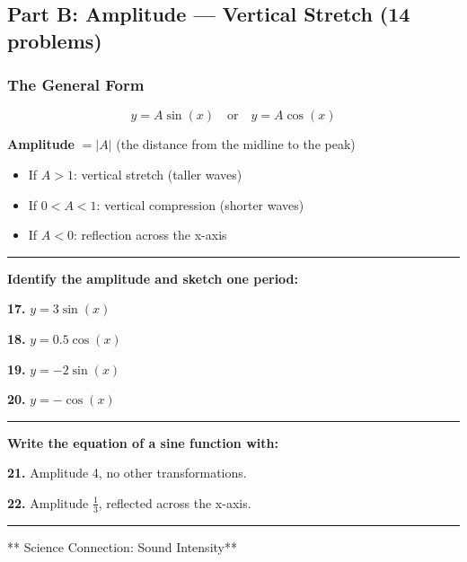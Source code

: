 \documentclass[
  11pt,
]{article}
\providecommand{\tightlist}{%
  \setlength{\itemsep}{0pt}\setlength{\parskip}{0pt}}
\begin{document}
\hypertarget{part-b-amplitude-vertical-stretch-14-problems}{%
\subsection{Part B: Amplitude --- Vertical Stretch (14
problems)}\label{part-b-amplitude-vertical-stretch-14-problems}}

\hypertarget{the-general-form}{%
\subsubsection{The General Form}\label{the-general-form}}

\[y = A\sin(x) \quad \text{or} \quad y = A\cos(x)\]

\textbf{Amplitude} \(= |A|\) (the distance from the midline to the peak)

\begin{itemize}
\tightlist
\item
  If \(A > 1\): vertical stretch (taller waves)
\item
  If \(0 < A < 1\): vertical compression (shorter waves)
\item
  If \(A < 0\): reflection across the x-axis
\end{itemize}

\begin{center}\rule{0.5\linewidth}{0.5pt}\end{center}

\textbf{Identify the amplitude and sketch one period:}

\textbf{17.} \(y = 3\sin(x)\)

\textbf{18.} \(y = 0.5\cos(x)\)

\textbf{19.} \(y = -2\sin(x)\)

\textbf{20.} \(y = -\cos(x)\)

\begin{center}\rule{0.5\linewidth}{0.5pt}\end{center}

\textbf{Write the equation of a sine function with:}

\textbf{21.} Amplitude 4, no other transformations.

\textbf{22.} Amplitude \(\frac{1}{3}\), reflected across the x-axis.

\begin{center}\rule{0.5\linewidth}{0.5pt}\end{center}

** Science Connection: Sound Intensity**
\end{document}
